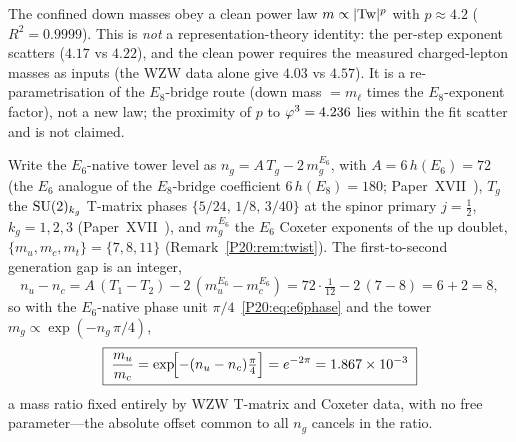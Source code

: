 \begin{remark}
\label{P20:rem:powerlaw}
The confined down masses obey a clean power law $m\propto|\mathrm{Tw}|^{p}$ with
$p\approx4.2$ ($R^2=0.9999$). This is \emph{not} a representation-theory
identity: the per-step exponent scatters ($4.17$ vs $4.22$), and the
clean power requires the measured charged-lepton masses as inputs (the
WZW data alone give $4.03$ vs $4.57$). It is a re-parametrisation of the
$E_8$-bridge route (down mass $=m_\ell$ times the $E_8$-exponent
factor), not a new law; the proximity of $p$ to $\varphi^3=4.236$ lies
within the fit scatter and is not claimed.
\end{remark}

\begin{proposition}
\label{P20:prop:up_ratio}
Write the $E_6$-native tower level as $n_g=A\,T_g-2\,m_g^{E_6}$, with
$A=6\,h(E_6)=72$ (the $E_6$ analogue of the $E_8$-bridge coefficient
$6\,h(E_8)=180$; Paper~XVII~\cite{Paper17}), $T_g$ the $\mathrm{SU}(2)_{k_g}$
T-matrix phases $\{5/24,\,1/8,\,3/40\}$ at the spinor primary $j=\tfrac12$,
$k_g=1,2,3$ (Paper~XVII~\cite{Paper17}), and $m_g^{E_6}$ the $E_6$ Coxeter
exponents of the up doublet, $\{m_u,m_c,m_t\}=\{7,8,11\}$
(Remark~\ref{P20:rem:twist}). The first-to-second generation gap is an
integer,
\begin{equation}
  n_u-n_c=A\,(T_1-T_2)-2\,(m_u^{E_6}-m_c^{E_6})
        =72\cdot\tfrac{1}{12}-2\,(7-8)=6+2=8,
  \label{P20:eq:up_gap}
\end{equation}
so with the $E_6$-native phase unit $\pi/4$~\eqref{P20:eq:e6phase} and the
tower $m_g\propto\exp(-n_g\,\pi/4)$,
\begin{equation}
  \boxed{\;\frac{m_u}{m_c}=\exp\!\Bigl[-(n_u-n_c)\tfrac{\pi}{4}\Bigr]
                =e^{-2\pi}=1.867\times10^{-3}\;}
  \label{P20:eq:up_ratio}
\end{equation}
a mass ratio fixed entirely by WZW T-matrix and Coxeter data, with no free
parameter---the absolute offset common to all $n_g$ cancels in the ratio.
\end{proposition}

